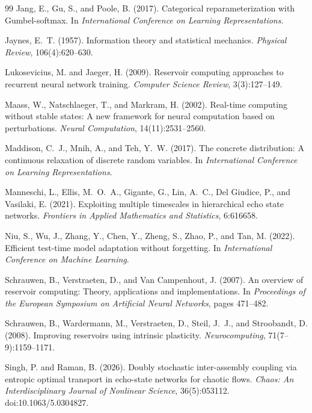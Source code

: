 \documentclass[11pt,a4paper]{article}
\begin{document}
\begin{thebibliography}{99}
Jang, E., Gu, S., and Poole, B. (2017).
Categorical reparameterization with Gumbel-softmax.
In \emph{International Conference on Learning Representations}.

Jaynes, E.~T. (1957).
Information theory and statistical mechanics.
\emph{Physical Review}, 106(4):620--630.

Lukosevicius, M. and Jaeger, H. (2009).
Reservoir computing approaches to recurrent neural network training.
\emph{Computer Science Review}, 3(3):127--149.

Maass, W., Natschlaeger, T., and Markram, H. (2002).
Real-time computing without stable states: A new framework for neural computation based on perturbations.
\emph{Neural Computation}, 14(11):2531--2560.

Maddison, C.~J., Mnih, A., and Teh, Y.~W. (2017).
The concrete distribution: A continuous relaxation of discrete random variables.
In \emph{International Conference on Learning Representations}.

Manneschi, L., Ellis, M.~O.~A., Gigante, G., Lin, A.~C., Del Giudice, P., and Vasilaki, E. (2021).
Exploiting multiple timescales in hierarchical echo state networks.
\emph{Frontiers in Applied Mathematics and Statistics}, 6:616658.

Niu, S., Wu, J., Zhang, Y., Chen, Y., Zheng, S., Zhao, P., and Tan, M. (2022).
Efficient test-time model adaptation without forgetting.
In \emph{International Conference on Machine Learning}.

Schrauwen, B., Verstraeten, D., and Van Campenhout, J. (2007).
An overview of reservoir computing: Theory, applications and implementations.
In \emph{Proceedings of the European Symposium on Artificial Neural Networks}, pages 471--482.

Schrauwen, B., Wardermann, M., Verstraeten, D., Steil, J.~J., and Stroobandt, D. (2008).
Improving reservoirs using intrinsic plasticity.
\emph{Neurocomputing}, 71(7--9):1159--1171.


Singh, P. and Raman, B. (2026).
Doubly stochastic inter-assembly coupling via entropic optimal transport in echo-state networks for chaotic flows.
\emph{Chaos: An Interdisciplinary Journal of Nonlinear Science}, 36(5):053112.
\newblock doi:10.1063/5.0304827.


\end{thebibliography}
\end{document}
